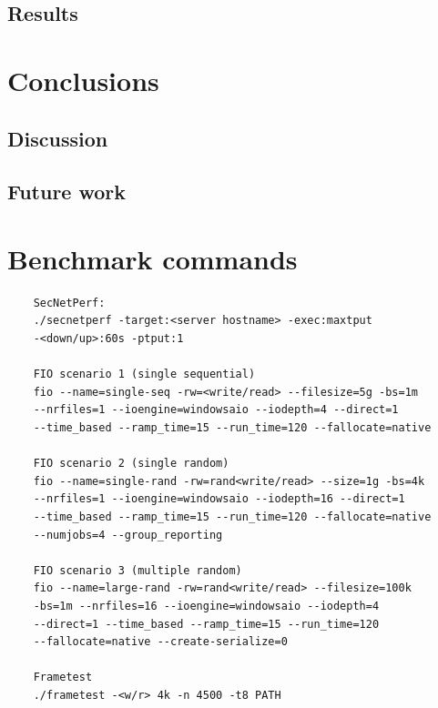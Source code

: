 \documentclass[english, 12pt, a4paper, elec, utf8, a-2b, online]{aaltothesis}
\begin{document}
\subsection{Results}
\clearpage
\section{Conclusions}
\label{sec:conclusion}
\label{sec:summary}

\subsection{Discussion}

\subsection{Future work}

\clearpage
\printbibliography[heading=bibintoc] %

\thesisappendix

\section{Benchmark commands}
\label{app:bench}
\begin{verbatim}
	SecNetPerf:
	./secnetperf -target:<server hostname> -exec:maxtput
	-<down/up>:60s -ptput:1

	FIO scenario 1 (single sequential)
	fio --name=single-seq -rw=<write/read> --filesize=5g -bs=1m
	--nrfiles=1 --ioengine=windowsaio --iodepth=4 --direct=1
	--time_based --ramp_time=15 --run_time=120 --fallocate=native

	FIO scenario 2 (single random)
	fio --name=single-rand -rw=rand<write/read> --size=1g -bs=4k
	--nrfiles=1 --ioengine=windowsaio --iodepth=16 --direct=1
	--time_based --ramp_time=15 --run_time=120 --fallocate=native
	--numjobs=4 --group_reporting

	FIO scenario 3 (multiple random)
	fio --name=large-rand -rw=rand<write/read> --filesize=100k
	-bs=1m --nrfiles=16 --ioengine=windowsaio --iodepth=4
	--direct=1 --time_based --ramp_time=15 --run_time=120
	--fallocate=native --create-serialize=0

	Frametest
	./frametest -<w/r> 4k -n 4500 -t8 PATH
\end{verbatim}
\end{document}
